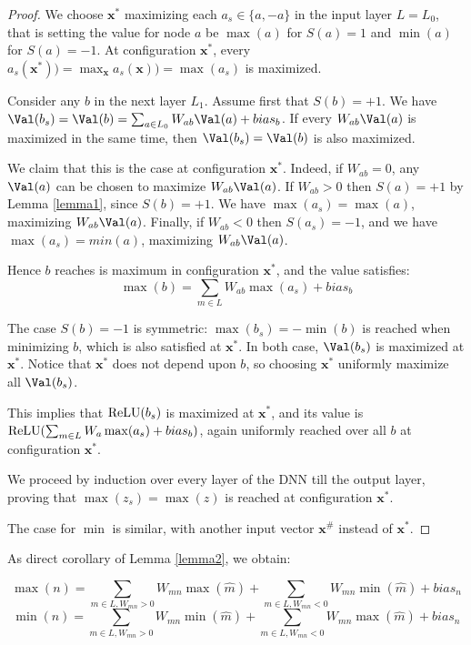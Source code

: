 		\begin{proof}
			We choose $\boldsymbol{x}^*$ maximizing each $a_s \in \{a,-a\}$ in the input layer $L=L_0$,
			that is setting the value for node $a$ be $\max(a)$ for $S(a)=1$ and $\min(a)$ for $S(a)=-1$.
			At configuration $\boldsymbol{x}^*$, every $a_s(\boldsymbol{x}^*))=\max_{\boldsymbol{x}} {a_s(\boldsymbol{x}))}=\max(a_s)$ is maximized.  
			
			Consider any $b$ in the next layer $L_1$.
			Assume first that $S(b)=+1$.
			We have $\Val(b_s)= \Val(b) = \sum_{a \in L_0} W_{ab} \Val(a) + bias_b$.
			If every $W_{ab} \Val(a)$ is maximized in the same time, 
			then $\Val(b_s)= \Val(b)$ is also maximized. 
			
			We claim that this is the case at 
			configuration $\boldsymbol{x}^*$.
			Indeed, if $W_{ab}=0$, any $\Val(a)$ can be chosen to maximize 
			$W_{ab}\Val(a)$. If $W_{ab}>0$ then $S(a) = +1$ by Lemma \ref{lemma1}, since
			$S(b)=+1$. We have $\max(a_s) = \max(a)$, maximizing $W_{ab}\Val(a)$.
			Finally, if $W_{a b}<0$ then $S(a_s) = -1$, and we have 
			$\max(a_s) = min(a)$, maximizing $W_{ab}\Val(a)$.
			
			Hence $b$ reaches is maximum in configuration $\boldsymbol{x}^*$, and the value satisfies: 
			$$\max(b)=\sum_{m \in L}W_{a b} \max(a_s)+bias_b$$
			
			The case $S(b)=-1$ is symmetric:
			$\max(b_s)= -\min(b)$ is reached when minimizing $b$, which is also 
			satisfied at $\boldsymbol{x}^*$.
			In both case, $\Val(b_s)$ is maximized at $\boldsymbol{x}^*$. Notice that $\boldsymbol{x}^*$ does not depend upon $b$, so choosing $\boldsymbol{x}^*$ uniformly maximize all $\Val(b_s)$.
			
			This implies that $\mathrm{ReLU}(b_s)$ is maximized at $\boldsymbol{x}^*$, and its value is 
			$\mathrm{ReLU}(\sum_{m \in L}W_{a }\max(a_s)+bias_b)$, again uniformly reached over all $b$ at configuration $\boldsymbol{x}^*$.
			
			We proceed by induction over every layer of the DNN till the output layer, proving that 
			$\max(z_s)=\max(z)$ is reached at configuration $\boldsymbol{x}^*$.
			
			The case for $\min$ is similar, with another input vector $\boldsymbol{x}^\#$ instead of $\boldsymbol{x}^*$.
		\end{proof}
		
		As direct corollary of Lemma \ref{lemma2}, we obtain:
		
		\begin{corollary}
			\label{cor1}
			$$\max(n)=\sum_{m \in L, W_{m n}>0}W_{m n} \max(\hat{m}) + \sum_{m \in L, W_{m n}<0}W_{mn} \min(\hat{m}) + bias_n$$
			$$\min(n)=\sum_{m \in L, W_{m n}>0}W_{m n} \min(\hat{m}) + \sum_{m \in L, W_{m n}<0}W_{mn} \max(\hat{m}) + bias_n$$
		\end{corollary}
		
